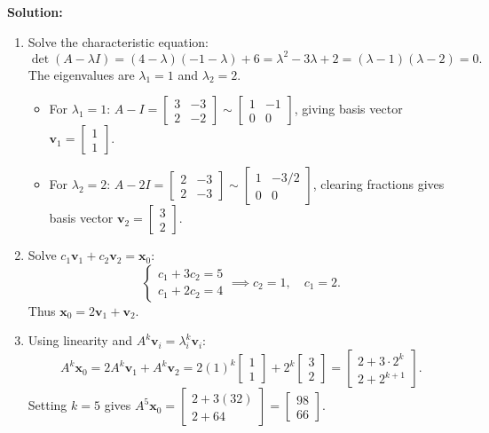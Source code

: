 \documentclass[11pt, letterpaper]{article}
\theoremstyle{definition}
\theoremstyle{remark}
\begin{document}
\textbf{Solution:}
\begin{enumerate}[label=(\alph*)]
    \item Solve the characteristic equation:
    \[
    \det(A - \lambda I) = (4 - \lambda)(-1 - \lambda) + 6 = \lambda^2 - 3\lambda + 2 = (\lambda - 1)(\lambda - 2) = 0.
    \]
    The eigenvalues are $\lambda_1 = 1$ and $\lambda_2 = 2$.
    \begin{itemize}
        \item For $\lambda_1 = 1$: $A - I = \begin{bmatrix} 3 & -3 \\ 2 & -2 \end{bmatrix} \sim \begin{bmatrix} 1 & -1 \\ 0 & 0 \end{bmatrix}$, giving basis vector $\mathbf{v}_1 = \begin{bmatrix} 1 \\ 1 \end{bmatrix}$.
        \item For $\lambda_2 = 2$: $A - 2I = \begin{bmatrix} 2 & -3 \\ 2 & -3 \end{bmatrix} \sim \begin{bmatrix} 1 & -3/2 \\ 0 & 0 \end{bmatrix}$, clearing fractions gives basis vector $\mathbf{v}_2 = \begin{bmatrix} 3 \\ 2 \end{bmatrix}$.
    \end{itemize}

    \item Solve $c_1\mathbf{v}_1 + c_2\mathbf{v}_2 = \mathbf{x}_0$:
    \[
    \begin{cases} c_1 + 3c_2 = 5 \\ c_1 + 2c_2 = 4 \end{cases} \implies c_2 = 1,\quad c_1 = 2.
    \]
    Thus $\mathbf{x}_0 = 2\mathbf{v}_1 + \mathbf{v}_2$.

    \item Using linearity and $A^k\mathbf{v}_i = \lambda_i^k\mathbf{v}_i$:
    \[
    A^k \mathbf{x}_0 = 2 A^k\mathbf{v}_1 + A^k\mathbf{v}_2 = 2(1)^k \begin{bmatrix} 1 \\ 1 \end{bmatrix} + 2^k \begin{bmatrix} 3 \\ 2 \end{bmatrix} = \begin{bmatrix} 2 + 3\cdot 2^k \\ 2 + 2^{k+1} \end{bmatrix}.
    \]
    Setting $k = 5$ gives $A^5\mathbf{x}_0 = \begin{bmatrix} 2 + 3(32) \\ 2 + 64 \end{bmatrix} = \begin{bmatrix} 98 \\ 66 \end{bmatrix}$.
\end{enumerate}
\end{document}
